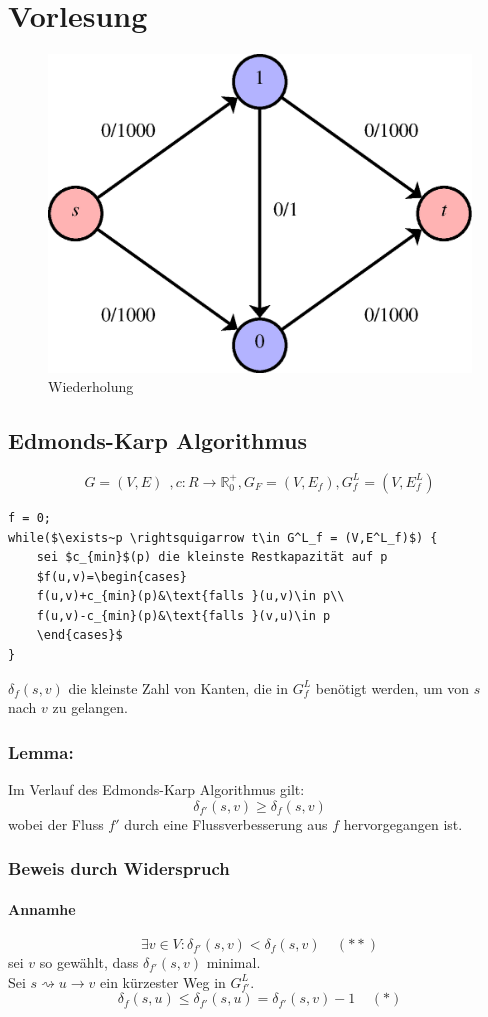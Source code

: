 \chapter{Vorlesung}
\begin{figure}[h]
\centering
\includegraphics[width=0.4\linewidth]{26/Grafik/Diagramm1}
\caption{Wiederholung}
\label{fig:Diagramm1}
\end{figure}

\section{Edmonds-Karp Algorithmus}
\[ G=(V,E)~~,c:R\rightarrow\mathbb{R}^+_0,G_F=(V,E_f), G^L_f=(V,E^L_f) \]
\begin{lstlisting}
f = 0;
while($\exists~p \rightsquigarrow t\in G^L_f = (V,E^L_f)$) {
	sei $c_{min}$(p) die kleinste Restkapazität auf p
	$f(u,v)=\begin{cases}
	f(u,v)+c_{min}(p)&\text{falls }(u,v)\in p\\
	f(u,v)-c_{min}(p)&\text{falls }(v,u)\in p
	\end{cases}$
} 
\end{lstlisting}
$\delta_f(s,v)$ die kleinste Zahl von Kanten, die in $G^L_f$ benötigt werden, um von $s$ nach $v$ zu gelangen.
\subsection{Lemma:}
Im Verlauf des Edmonds-Karp Algorithmus gilt:
\[ \delta_{f'}(s,v) \geq \delta_f(s,v) \]
wobei der Fluss $f'$ durch eine Flussverbesserung aus $f$ hervorgegangen ist.
\subsection{Beweis durch Widerspruch}
\subsubsection{Annamhe}
\[ \exists v\in V:\delta_{f'}(s,v)<\delta_f(s,v) ~~~~~(**)\]
sei $v$ so gewählt, dass $\delta_{f'}(s,v)$ minimal.\\
Sei $s\rightsquigarrow u\rightarrow v$ ein kürzester Weg in $G^L_{f'}$.
\[ \delta_f(s,u)\leq\delta_{f'}(s,u) = \delta_{f'}(s,v)-1~~~~~(*) \]
